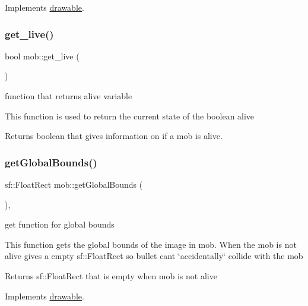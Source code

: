Implements \hyperlink{classdrawable_a4e49e2c1121704c83ce24c5f48dd910f}{drawable}.

\mbox{\label{classmob_ab327a1798c02be3f9db7c1d01b17ba02}} 
\subsubsection{\texorpdfstring{get\+\_\+live()}{get\_live()}}
{\footnotesize\ttfamily bool mob\+::get\+\_\+live (\begin{DoxyParamCaption}{ }\end{DoxyParamCaption})}



function that returns alive variable 

This function is used to return the current state of the boolean alive

\begin{DoxyReturn}{Returns}
boolean that gives information on if a mob is alive. 
\end{DoxyReturn}
\mbox{\label{classmob_af3859378fad2a5f93a1c4d833ff74d5d}} 
\subsubsection{\texorpdfstring{get\+Global\+Bounds()}{getGlobalBounds()}}
{\footnotesize\ttfamily sf\+::\+Float\+Rect mob\+::get\+Global\+Bounds (\begin{DoxyParamCaption}{ }\end{DoxyParamCaption})\hspace{0.3cm}{\ttfamily [override]}, {\ttfamily [virtual]}}



get function for global bounds 

This function gets the global bounds of the image in mob. When the mob is not alive gives a empty sf\+::\+Float\+Rect so bullet can\textquotesingle{}t \char`\"{}accidentally\char`\"{} collide with the mob

\begin{DoxyReturn}{Returns}
sf\+::\+Float\+Rect that is empty when mob is not alive 
\end{DoxyReturn}


Implements \hyperlink{classdrawable_ae013ac0be47538be9ce885d6642daf73}{drawable}.

